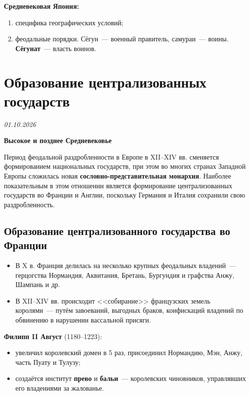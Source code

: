 \documentclass[a4paper, 12pt]{article}
\newcommand{\lecdate}[1]{\vspace{-4pt}\hfill{\small\textit{#1}}\par}
\begin{document}
\textbf{Средневековая Япония:}
\begin{enumerate}[noitemsep]
  \item специфика географических условий;
  \item феодальные порядки. Сёгун~--- военный правитель, самураи~--- воины. \textbf{Сёгунат}~--- власть
  воинов.
\end{enumerate}

\section{Образование централизованных государств}
\lecdate{01.10.2026}

\begin{center}
\textbf{Высокое и позднее Средневековье}
\end{center}

Период феодальной раздробленности в Европе в XII--XIV вв. сменяется
формированием национальных государств, при этом во многих странах Западной
Европы сложилась новая \textbf{сословно-представительная монархия}. Наиболее
показательным в этом отношении является формирование централизованных
государств во Франции и Англии, поскольку Германия и Италия сохранили свою
раздробленность.

\subsection{Образование централизованного государства во Франции}
\begin{itemize}[noitemsep]
  \item В X в. Франция делилась на несколько крупных феодальных владений~---
  герцогства Нормандия, Аквитания, Бретань, Бургундия и графства Анжу,
  Шампань и др.
  \item В XII--XIV вв. происходит <<собирание>> французских земель
  королями~--- путём завоеваний, выгодных браков, конфискаций владений по
  обвинению в нарушении вассальной присяги.
\end{itemize}

\textbf{Филипп II Август} (1180--1223):
\begin{itemize}[noitemsep]
  \item увеличил королевский домен в 5 раз, присоединил Нормандию, Мэн, Анжу,
  часть Пуату и Тулузу;
  \item создаётся институт \textbf{прево} и \textbf{бальи}~--- королевских
  чиновников, управлявших его владениями за жалованье.
\end{itemize}
\end{document}
